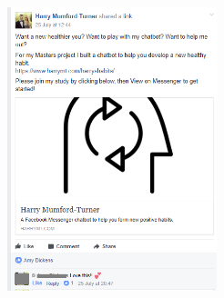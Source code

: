 \begin{figure}[H]
  \hspace{10px}
  \includegraphics[width=2.4in]{resources/feedback/adverts/hacksoc-post.png}
\end{figure}
